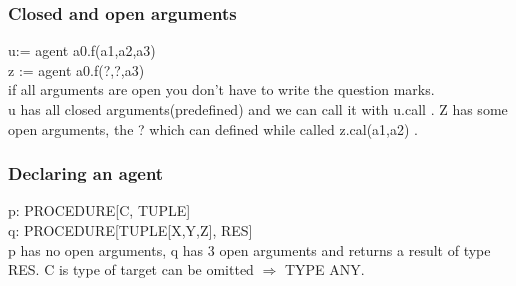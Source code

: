 \documentclass[11pt]{article}
\begin{document}
\subsubsection{Closed and open arguments}
u:= agent a0.f(a1,a2,a3)\\
z := agent a0.f(?,?,a3)\\
if all arguments are open you don't have to write the question marks.\\
u has all closed arguments(predefined) and we can call it with u.call   . Z has some open arguments, the ? which can defined while called z.cal(a1,a2)   .
\subsubsection{Declaring an agent}
p: PROCEDURE[C, TUPLE]\\
q: PROCEDURE[TUPLE[X,Y,Z], RES]\\
p has no open arguments, q has 3 open arguments and returns a result of type RES. C is type of target can be omitted $\Rightarrow$ TYPE ANY.







 




 


 




 
\end{document}
